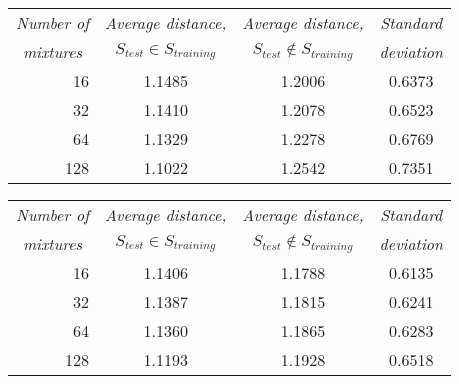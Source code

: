 \begin{table}[htbp]
	\begin{center}
		\label{tab:accuracy_comparison_10k}	
		\begin{tabular}{r|c|cc}
			\toprule
				\multicolumn{1}{c}{\emph{Number of}} & \multicolumn{1}{c}{\emph{Average distance,}} & \multicolumn{1}{c}{\emph{Average distance,}} & \multicolumn{1}{c}{\emph{Standard}} \\
			\multicolumn{1}{c}{\emph{mixtures}}	& \multicolumn{1}{c}{$S_{test}\in S_{training}$} & \multicolumn{1}{c}{$S_{test}\notin S_{training}$} & \multicolumn{1}{c}{\emph{deviation}}\\
			\midrule
			16 & 1.1485 & 1.2006 & 0.6373\\
			32 & 1.1410 & 1.2078 & 0.6523\\
			64 & 1.1329 & 1.2278 & 0.6769\\
			128 & 1.1022 & 1.2542 & 0.7351\\
			\bottomrule			
		\end{tabular}		
	\end{center}
\end{table}

\begin{table}[htbp]
	\begin{center}
		\label{tab:accuracy_comparison_20k}	
		\begin{tabular}{r|c|cc}
			\toprule
			\multicolumn{1}{c}{\emph{Number of}} & \multicolumn{1}{c}{\emph{Average distance,}} & \multicolumn{1}{c}{\emph{Average distance,}} & \multicolumn{1}{c}{\emph{Standard}} \\
		\multicolumn{1}{c}{\emph{mixtures}}	& \multicolumn{1}{c}{$S_{test}\in S_{training}$} & \multicolumn{1}{c}{$S_{test}\notin S_{training}$} & \multicolumn{1}{c}{\emph{deviation}}\\
			\midrule
			16 & 1.1406 & 1.1788 & 0.6135\\
			32 & 1.1387 & 1.1815 & 0.6241\\
			64 & 1.1360 & 1.1865 & 0.6283\\
			128 & 1.1193 & 1.1928 & 0.6518\\
			\bottomrule			
		\end{tabular}		
	\end{center}
\end{table}

